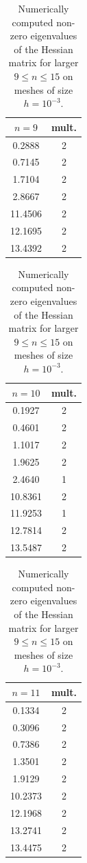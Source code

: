 \documentclass[JEP,XML,SOM,Unicode,ThmDefs,NoFloatCountersInSection,published]{cedram}
\theoremstyle{plain}
\theoremstyle{definition}
\begin{document}
\begin{table}
\smaller
\caption{Numerically computed non-zero eigenvalues of the Hessian matrix for larger $9\leq n \leq 15$ on meshes of size $h=10^{-3}$.}
\label{tab:eig-numeric}
\centering
\raisebox{25pt}
{\begin{minipage}{.2\textwidth}
\begin{tabular}{|c|c|}
\hline
$n = 9$ & mult.\\ \hline
0.2888 & 2\\
0.7145 & 2\\
1.7104 & 2\\
2.8667 & 2\\
11.4506 & 2\\
12.1695 & 2\\
13.4392 & 2\\
\hline
\end{tabular}
\end{minipage}}
\raisebox{12.5pt}
{\begin{minipage}{.2\textwidth}
\begin{tabular}{|c|c|}
\hline
$n = 10$ & mult.\\ \hline
0.1927 & 2\\
0.4601 & 2\\
1.1017 & 2\\
1.9625 & 2\\
2.4640 & 1\\
10.8361 & 2\\
11.9253 & 1\\
12.7814 & 2\\
13.5487 & 2\\
\hline
\end{tabular}
\end{minipage}}
\raisebox{12.5pt}
{\begin{minipage}{.2\textwidth}
\begin{tabular}{|c|c|}
\hline
$n = 11$ & mult.\\ \hline
0.1334 & 2\\
0.3096& 2\\
0.7386& 2\\
1.3501& 2\\
1.9129& 2\\
10.2373& 2\\
12.1968& 2\\
13.2741& 2\\
13.4475& 2\\
\hline
\end{tabular}
\end{minipage}}
\begin{minipage}{.2\textwidth}

\end{minipage}
\end{table}
\end{document}
